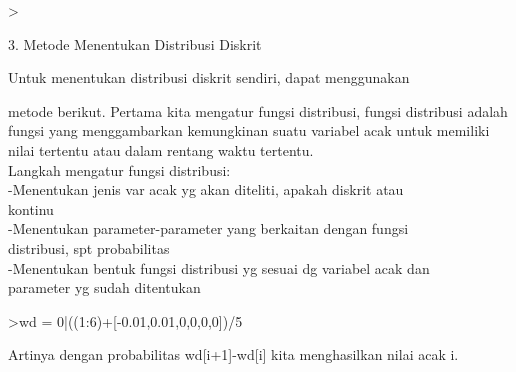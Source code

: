 \documentclass[a4paper,10pt]{article}
\begin{document}
\begin{eulernotebook}
\begin{eulercomment}
\begin{eulercomment}
\begin{eulercomment}
\begin{eulercomment}
\begin{eulercomment}
\begin{eulercomment}
\begin{eulercomment}
\begin{eulercomment}
\begin{eulercomment}
\end{eulercomment}
\begin{eulerprompt}
> 
\end{eulerprompt}
\eulersubheading{}
\begin{eulercomment}
3. Metode Menentukan Distribusi Diskrit

\end{eulercomment}
\begin{eulerttcomment}
      Untuk menentukan distribusi diskrit sendiri, dapat menggunakan
\end{eulerttcomment}
\begin{eulercomment}
metode berikut. Pertama kita mengatur fungsi distribusi, fungsi
distribusi adalah fungsi yang menggambarkan kemungkinan suatu variabel
acak untuk memiliki nilai tertentu atau dalam rentang waktu tertentu.\\
Langkah mengatur fungsi distribusi:\\
-Menentukan jenis var acak yg akan diteliti, apakah diskrit atau\\
kontinu\\
-Menentukan parameter-parameter yang berkaitan dengan fungsi\\
distribusi, spt probabilitas\\
-Menentukan bentuk fungsi distribusi yg sesuai dg variabel acak dan\\
parameter yg sudah ditentukan
\end{eulercomment}
\begin{eulerprompt}
>wd = 0|((1:6)+[-0.01,0.01,0,0,0,0])/5
\end{eulerprompt}
\begin{euleroutput}
  [0,  0.198,  0.402,  0.6,  0.8,  1,  1.2]
\end{euleroutput}
\begin{eulercomment}
Artinya dengan probabilitas wd[i+1]-wd[i] kita menghasilkan nilai acak
i.


\end{eulercomment}
\end{eulercomment}
\end{eulercomment}
\end{eulercomment}
\end{eulercomment}
\end{eulercomment}
\end{eulercomment}
\end{eulercomment}
\end{eulercomment}
\end{eulernotebook}
\end{document}
